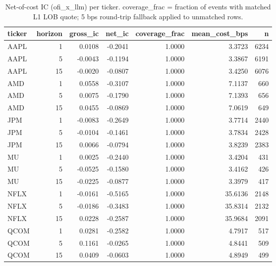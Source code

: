\begin{table}[htbp]
\centering
\caption{Net-of-cost IC (ofi\_x\_llm) per ticker. coverage\_frac = fraction of events with matched L1 LOB quote; 5 bps round-trip fallback applied to unmatched rows.}
\label{tab:net_ic}
\begin{tabular}{lrrrrrr}
\toprule
ticker & horizon & gross\_ic & net\_ic & coverage\_frac & mean\_cost\_bps & n \\
\midrule
AAPL & 1 & 0.0108 & -0.2041 & 1.0000 & 3.3723 & 6234 \\
AAPL & 5 & -0.0043 & -0.1194 & 1.0000 & 3.3867 & 6191 \\
AAPL & 15 & -0.0020 & -0.0807 & 1.0000 & 3.4250 & 6076 \\
AMD & 1 & 0.0558 & -0.3107 & 1.0000 & 7.1137 & 660 \\
AMD & 5 & 0.0075 & -0.1790 & 1.0000 & 7.1393 & 656 \\
AMD & 15 & 0.0455 & -0.0869 & 1.0000 & 7.0619 & 649 \\
JPM & 1 & -0.0083 & -0.2649 & 1.0000 & 3.7714 & 2440 \\
JPM & 5 & -0.0104 & -0.1461 & 1.0000 & 3.7834 & 2428 \\
JPM & 15 & 0.0066 & -0.0794 & 1.0000 & 3.8239 & 2383 \\
MU & 1 & 0.0025 & -0.2440 & 1.0000 & 3.4204 & 431 \\
MU & 5 & -0.0525 & -0.1580 & 1.0000 & 3.4162 & 426 \\
MU & 15 & -0.0225 & -0.0877 & 1.0000 & 3.3979 & 417 \\
NFLX & 1 & -0.0161 & -0.5165 & 1.0000 & 35.6136 & 2148 \\
NFLX & 5 & -0.0186 & -0.3483 & 1.0000 & 35.8314 & 2132 \\
NFLX & 15 & 0.0228 & -0.2587 & 1.0000 & 35.9684 & 2091 \\
QCOM & 1 & 0.0281 & -0.2582 & 1.0000 & 4.7917 & 517 \\
QCOM & 5 & 0.1161 & -0.0265 & 1.0000 & 4.8441 & 509 \\
QCOM & 15 & 0.0409 & -0.0603 & 1.0000 & 4.8949 & 499 \\
\bottomrule
\end{tabular}
\end{table}
